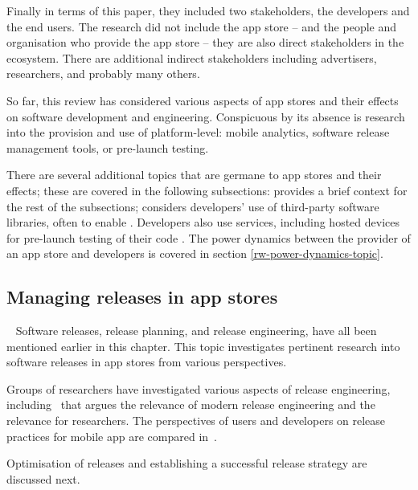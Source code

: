 Finally in terms of this paper, they included two stakeholders, the developers and the end users. The research did not include the app store -- and the people and organisation who provide the app store -- they are also direct stakeholders in the ecosystem. There are additional indirect stakeholders including advertisers, researchers, and probably many others. 

So far, this review has considered various aspects of app stores and their effects on software development and engineering. Conspicuous by its absence is research into the provision and use of platform-level: mobile analytics, software release management tools, or pre-launch testing. 

There are several additional topics that are germane to app stores and their effects; these are covered in the following subsections:  provides a brief context for the rest of the subsections;  considers developers' use of third-party software libraries, often to enable . Developers also use services, including hosted devices for pre-launch testing of their code . The power dynamics between the provider of an app store and developers is covered in section \ref{rw-power-dynamics-topic}.


\subsection{Managing releases in app stores}~\label{rw-managing-releases-in-app-stores-topic}
Software releases, release planning, and release engineering, have all been mentioned earlier in this chapter. This topic investigates pertinent research into software releases in app stores from various perspectives.

Groups of researchers have investigated various aspects of release engineering, including~ that argues the relevance of modern release engineering and the relevance for researchers. The perspectives of users and developers on release practices for mobile app are compared in~.

Optimisation of releases and establishing a successful release strategy are discussed next. 

